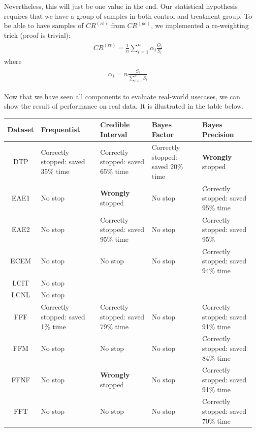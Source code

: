 \documentclass[paper=a4, fontsize=11pt]{scrartcl} %
\numberwithin{equation}{section} %
\numberwithin{figure}{section} %
\numberwithin{table}{section} %
\begin{document}
Nevertheless, this will just be one value in the end. Our statistical hypothesis requires that we have a group of samples in both control and treatment group.
To be able to have samples of $CR^{(rt)}$ from $CR^{(pe)}$, we implemented a re-weighting trick (proof is trivial):
\begin{align} 
\begin{split}
CR^{(rt)} = \frac{1}{n} \sum_{i=1}^{n} \alpha_i \frac{O_i}{S_i}
\end{split}					
\end{align}
where
\begin{align} 
\begin{split}
\alpha_i  = n \frac{S_i}{\sum_{i=1}^{n} S_i}
\end{split}					
\end{align}

Now that we have seen all components to evaluate real-world usecases, we can show the result of performance on real data. It is illustrated in the table below.

\begin{center}
  \begin{tabular}{ | c | p{30mm} | p{30mm} | p{30mm} | p{30mm} |}
    \hline
     Dataset & Frequentist  & Credible Interval & Bayes Factor & Bayes Precision \\ \hline\hline
     DTP & Correctly stopped: saved 35\% time & Correctly stopped: saved 65\% time & Correctly stopped: saved 20\% time & \textbf{Wrongly} stopped \\ \hline
     EAE1 & No stop & \textbf{Wrongly} stopped & No stop & Correctly stopped: saved 95\% time \\ \hline
     EAE2 & No stop & Correctly stopped: saved 95\% time & No stop & Correctly stopped: saved 95\% \\ \hline
     ECEM & No stop & No stop & No stop & Correctly stopped: saved 94\% time \\ \hline
     LCIT & No stop & & & \\ \hline
     LCNL & No stop & & & \\ \hline
     FFF & Correctly stopped: saved 1\% time & Correctly stopped: saved 79\% time & No stop & Correctly stopped: saved 91\% time \\ \hline
     FFM & No stop & No stop & No stop & Correctly stopped: saved 84\% time \\ \hline
     FFNF & No stop & \textbf{Wrongly} stopped & No stop & Correctly stopped: saved 91\% time\\ \hline
     FFT & No stop & No stop & No stop & Correctly stopped: saved 70\% time \\ \hline
  \end{tabular}
\end{center}
\end{document}
